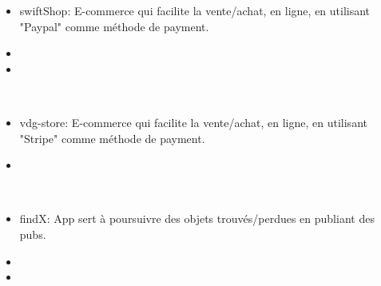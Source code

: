 \documentclass[10pt,a4paper,ragged2e,withhyper]{altacv}
\begin{document}
\begin{paracol}{2}
            \begin{itemize}
                \item swiftShop: E-commerce qui facilite la vente/achat, en ligne, en utilisant "Paypal" comme méthode de payment. 
                \item 
                \item 
            \end{itemize}
                 \\
                  \divider
            \begin{itemize}
                 \item vdg-store: E-commerce qui facilite la vente/achat, en ligne, en utilisant "Stripe" comme méthode de payment. 
                \item 
            \end{itemize}
            \\
            \divider
            \begin{itemize}
                 \item findX: App sert à poursuivre des objets trouvés/perdues en publiant des pubs. 
                \item 
                \item 
            \end{itemize}
            
          
               \smallskip
              

\end{paracol}
\end{document}
